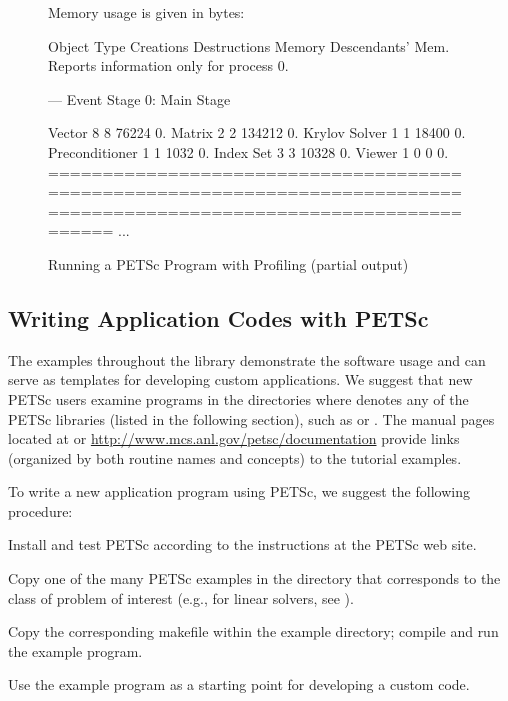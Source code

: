 \begin{figure}[H]
{\begin{outputlisting}[\fontsize{7.5pt}{8pt}\ttfamily]
Memory usage is given in bytes:

Object Type          Creations   Destructions     Memory  Descendants' Mem.
Reports information only for process 0.

--- Event Stage 0: Main Stage

              Vector     8              8        76224     0.
              Matrix     2              2       134212     0.
       Krylov Solver     1              1        18400     0.
      Preconditioner     1              1         1032     0.
           Index Set     3              3        10328     0.
              Viewer     1              0            0     0.
========================================================================================================================
...
\end{outputlisting}
}
\nobreak
\caption{Running a PETSc Program with Profiling (partial output)}
\label{fig_exprof}
\end{figure}

\subsection*{Writing Application Codes with PETSc}

The examples throughout the library demonstrate the software usage
and can serve as templates for developing
custom applications.  We suggest that new PETSc
users examine programs in the directories
where 
denotes any of the PETSc libraries (listed in the following
section), such as  or .
The manual pages located at  or 
\href{http://www.mcs.anl.gov/petsc/documentation}{http://www.mcs.anl.gov/petsc/documentation}
provide links (organized by both routine names and concepts) to the tutorial examples.

To write a new application program using PETSc, we suggest the
following procedure:
\begin{tightenumerate}
\item Install and test PETSc according to the instructions at the PETSc web site.
\item Copy one of the many PETSc examples in the directory
      that corresponds to the class of problem of interest (e.g.,
      for linear solvers, see ).
\item Copy the corresponding makefile within the example directory;
      compile and run the example program.
\item Use the example program as a starting point for developing a custom code.
\end{tightenumerate}

